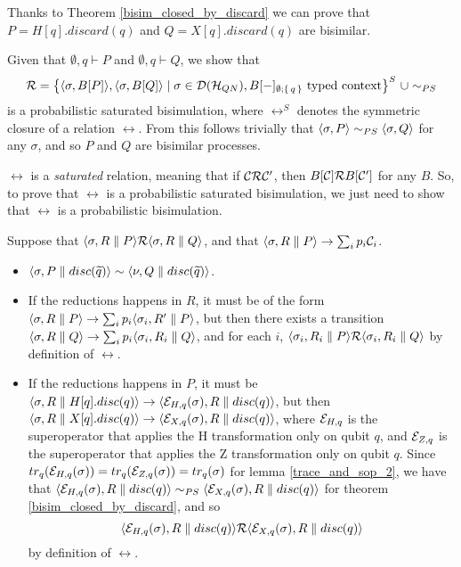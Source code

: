 \begin{example}Thanks to Theorem \ref{bisim_closed_by_discard} we can prove that $P = H[q].discard(q)$ and $Q = X[q].discard(q)$ are bisimilar.

Given that $\emptyset, {q} \vdash P$ and $\emptyset, {q} \vdash Q$, we show that
\[\mathcal{R} = \big\{\langle\sigma, B[P]\rangle, \langle\sigma, B[Q]\rangle \mid \sigma \in \mathcal{D}(\mathcal{H}_{QN}), B[{-}]_{\emptyset; \set{q}} \text{ typed context}\big\}^S\ \cup \sim_{PS}
\]
is a probabilistic saturated bisimulation, where $\rel^S$ denotes the symmetric closure of a relation $\rel$. From this follows trivially that $\langle\sigma, P\rangle \sim_{PS} \langle\sigma, Q\rangle$ for any $\sigma$, and so $P$ and $Q$ are bisimilar processes.

$\rel$ is a \textit{saturated} relation, meaning that if $\mathcal{C} \mathcal{R} \mathcal{C}'$, then $B[\mathcal{C}] \mathcal{R} B[\mathcal{C}']$ for any $B$. So, to prove that $\rel$ is a probabilistic saturated bisimulation, we just need to show that $\rel$ is a probabilistic bisimulation.

Suppose that $\langle\sigma, R \parallel P\rangle \mathcal{R} \langle\sigma, R \parallel Q\rangle$, and that $\langle\sigma, R \parallel P\rangle \rightarrow \sum_i p_i \mathcal{C}_i$.\begin{itemize}
\item $\langle\sigma, P \parallel disc(\widetilde{q})\rangle \sim \langle\nu, Q \parallel disc(\widetilde{q})\rangle$.
\item If the reductions happens in $R$, it must be of the form $\langle\sigma, R \parallel P\rangle \rightarrow \sum_i p_i \langle\sigma_i, R' \parallel P\rangle$, but then there exists a transition $\langle\sigma, R \parallel Q\rangle \rightarrow \sum_i p_i \langle\sigma_i, R_i \parallel Q\rangle$, and for each $i$, $\langle\sigma_i, R_i \parallel P\rangle \mathcal{R} \langle\sigma_i, R_i \parallel Q\rangle$ by definition of $\rel$.
\item If the reductions happens in $P$, it must be 
 $\langle\sigma, R \parallel H[q].disc(q)\rangle \rightarrow \langle\mathcal{E}_{H, q}(\sigma), R \parallel disc(q)\rangle$, but then  $\langle\sigma, R \parallel X[q].disc(q)\rangle \rightarrow \langle\mathcal{E}_{X, q}(\sigma), R \parallel disc(q)\rangle$, where $\mathcal{E}_{H, q}$ is the superoperator that applies the H transformation only on qubit $q$, and $\mathcal{E}_{Z, q}$ is the superoperator that applies the Z transformation only on qubit $q$. 
Since $tr_q(\mathcal{E}_{H, q}(\sigma)) = tr_q(\mathcal{E}_{Z, q}(\sigma)) = tr_q(\sigma)$ for lemma \ref{trace_and_sop_2}, we have that $\langle\mathcal{E}_{H, q}(\sigma), R \parallel disc(q)\rangle \sim_{PS} \langle\mathcal{E}_{X, q}(\sigma), R \parallel disc(q)\rangle$ for theorem \ref{bisim_closed_by_discard}, and so $$\langle\mathcal{E}_{H, q}(\sigma), R \parallel disc(q)\rangle \mathcal{R} \langle\mathcal{E}_{X, q}(\sigma), R \parallel disc(q)\rangle$$ by definition of $\rel$.
\end{itemize}
\end{example}
